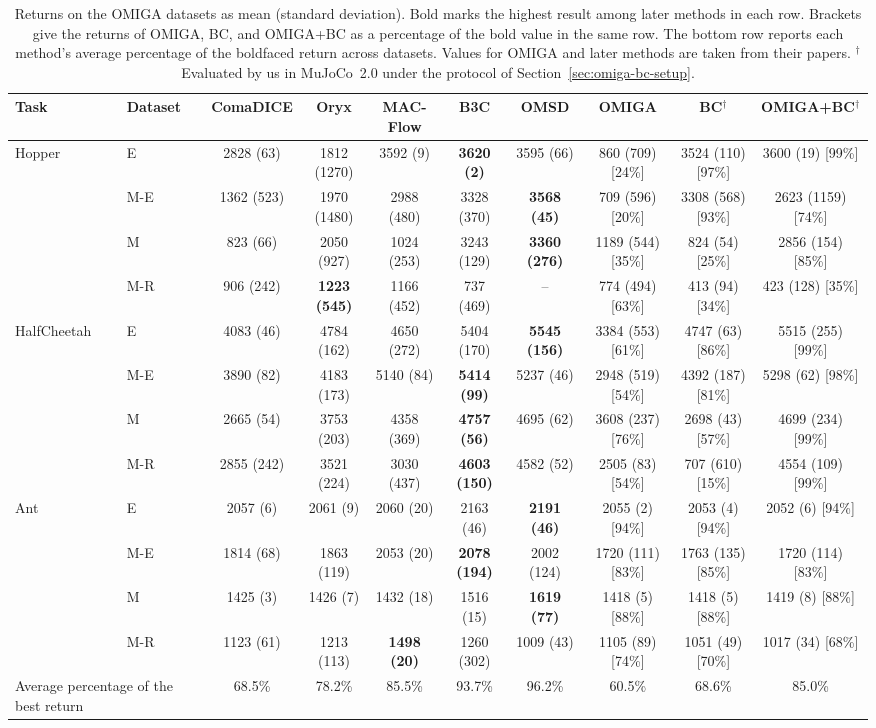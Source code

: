 \begin{table}[t]
\centering
\footnotesize
\caption{Returns on the OMIGA datasets as mean (standard deviation). Bold marks the highest result among later methods in each row. Brackets give the returns of OMIGA, BC, and OMIGA+BC as a percentage of the bold value in the same row. The bottom row reports each method's average percentage of the boldfaced return across datasets. Values for OMIGA and later methods are taken from their papers. $^\dagger$Evaluated by us in MuJoCo~2.0 under the protocol of Section~\ref{sec:omiga-bc-setup}.}
\label{tab:compare}
\setlength{\tabcolsep}{3pt}
\begin{tabular*}{\textwidth}{@{\extracolsep{\fill}}llcccccccc}
\hline
Task & Dataset & ComaDICE & Oryx & MAC-Flow & B3C & OMSD & OMIGA & BC$^\dagger$ & OMIGA+BC$^\dagger$ \\
\hline
Hopper & E & 2828 (63) & 1812 (1270) & 3592 (9) & \textbf{3620 (2)} & 3595 (66) & 860 (709) [24\%] & 3524 (110) [97\%] & 3600 (19) [99\%] \\
 & M-E & 1362 (523) & 1970 (1480) & 2988 (480) & 3328 (370) & \textbf{3568 (45)} & 709 (596) [20\%] & 3308 (568) [93\%] & 2623 (1159) [74\%] \\
 & M & 823 (66) & 2050 (927) & 1024 (253) & 3243 (129) & \textbf{3360 (276)} & 1189 (544) [35\%] & 824 (54) [25\%] & 2856 (154) [85\%] \\
 & M-R & 906 (242) & \textbf{1223 (545)} & 1166 (452) & 737 (469) & -- & 774 (494) [63\%] & 413 (94) [34\%] & 423 (128) [35\%] \\
\hline
HalfCheetah & E & 4083 (46) & 4784 (162) & 4650 (272) & 5404 (170) & \textbf{5545 (156)} & 3384 (553) [61\%] & 4747 (63) [86\%] & 5515 (255) [99\%] \\
 & M-E & 3890 (82) & 4183 (173) & 5140 (84) & \textbf{5414 (99)} & 5237 (46) & 2948 (519) [54\%] & 4392 (187) [81\%] & 5298 (62) [98\%] \\
 & M & 2665 (54) & 3753 (203) & 4358 (369) & \textbf{4757 (56)} & 4695 (62) & 3608 (237) [76\%] & 2698 (43) [57\%] & 4699 (234) [99\%] \\
 & M-R & 2855 (242) & 3521 (224) & 3030 (437) & \textbf{4603 (150)} & 4582 (52) & 2505 (83) [54\%] & 707 (610) [15\%] & 4554 (109) [99\%] \\
\hline
Ant & E & 2057 (6) & 2061 (9) & 2060 (20) & 2163 (46) & \textbf{2191 (46)} & 2055 (2) [94\%] & 2053 (4) [94\%] & 2052 (6) [94\%] \\
 & M-E & 1814 (68) & 1863 (119) & 2053 (20) & \textbf{2078 (194)} & 2002 (124) & 1720 (111) [83\%] & 1763 (135) [85\%] & 1720 (114) [83\%] \\
 & M & 1425 (3) & 1426 (7) & 1432 (18) & 1516 (15) & \textbf{1619 (77)} & 1418 (5) [88\%] & 1418 (5) [88\%] & 1419 (8) [88\%] \\
 & M-R & 1123 (61) & 1213 (113) & \textbf{1498 (20)} & 1260 (302) & 1009 (43) & 1105 (89) [74\%] & 1051 (49) [70\%] & 1017 (34) [68\%] \\
\hline
\multicolumn{2}{l}{Average percentage of the best return} & 68.5\% & 78.2\% & 85.5\% & 93.7\% & 96.2\% & 60.5\% & 68.6\% & 85.0\% \\
\hline
\end{tabular*}
\end{table}
